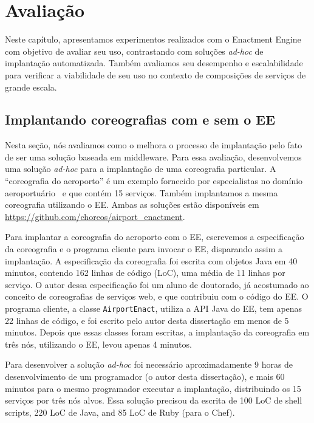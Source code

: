 \chapter{Avaliação}
\label{cap:avaliacao}

Neste capítulo, apresentamos experimentos realizados com o Enactment Engine com objetivo de avaliar
seu uso, contrastando com soluções \emph{ad-hoc} de implantação automatizada.
Também avaliamos seu desempenho e escalabilidade para verificar a viabilidade de seu uso
no contexto de composições de serviços de grande escala.

\section{Implantando coreografias com e sem o EE}
\label{sec:avaliacao_eng_sw}

Nesta seção, nós avaliamos como o \ee melhora o processo de implantação
pelo fato de ser uma solução baseada em middleware.
Para essa avaliação, desenvolvemos uma solução \emph{ad-hoc}
para a implantação de uma coreografia particular.
A ``coreografia do aeroporto'' é um exemplo fornecido por especialistas
no domínio aeroportuário~\cite{Choreos2012D6.2} e que contém 15 serviços.
Também implantamos a mesma coreografia utilizando o EE.
Ambas as soluções estão disponíveis em \url{https://github.com/choreos/airport_enactment}.

Para implantar a coreografia do aeroporto com o EE, escrevemos
a especificação da coreografia e o programa cliente para invocar o EE,
disparando assim a implantação.
A especificação da coreografia foi escrita com objetos Java em 40 minutos,
contendo 162 linhas de código (LoC), uma média de 11 linhas por serviço.
O autor dessa especificação foi um aluno de doutorado, já acostumado ao conceito
de coreografias de serviços web, e que contribuiu com o código do EE.
O programa cliente, a classe \texttt{AirportEnact}, utiliza a API Java do EE,
tem apenas 22 linhas de código, e foi escrito pelo autor desta dissertação
em menos de 5 minutos.
Depois que essas classes foram escritas, a implantação da coreografia em
três nós, utilizando o EE, levou apenas 4 minutos.

Para desenvolver a solução \emph{ad-hoc} foi necessário aproximadamente
9 horas de desenvolvimento de um programador (o autor desta dissertação), e mais 60 minutos
para o mesmo programador executar a implantação, distribuindo os 15
serviços por três nós alvos.
Essa solução precisou da escrita de 
100 LoC de shell scripts, 220 LoC de Java, and 85 LoC de Ruby (para o Chef). 

